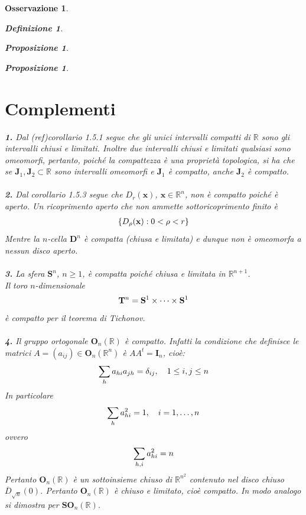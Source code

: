 \documentclass[oneside, 11pt]{amsbook}
\newcommand{\0}{{(0)}}
\newcommand{\3}{{(3)}}
\theoremstyle{colonplain}
\newtheorem{prop}[thm]{Proposizione}
\theoremstyle{colondefinition}
\newtheorem{defn}[thm]{Definizione}
\theoremstyle{colonremark}
\newtheorem{rmk}[thm]{Osservazione}
\numberwithin{equation}{chapter}
\begin{document}
\begin{rmk}
\begin{defn}
\begin{prop}
\begin{prop}
\section{Complementi}
\textbf{1.} Dal (ref)\textit{corollario 1.5.1} segue che gli unici intervalli compatti di $\mathbb{R}$ sono gli intervalli chiusi e limitati. Inoltre due intervalli chiusi e limitati qualsiasi sono omeomorfi, pertanto, poiché la compattezza è una proprietà topologica, si ha che se $\mathbf{J}_1, \mathbf{J}_2 \subset \mathbb{R}$ sono intervalli omeomorfi e $\mathbf{J}_1$ è compatto, anche $\mathbf{J}_2$ è compatto. \\ \\
\textbf{2.} Dal \textit{corollario 1.5.3} segue che $D_r(\mathbf{x})$, $\mathbf{x} \in \mathbb{R}^n$, non è compatto poiché è aperto. Un ricoprimento aperto che non ammette sottoricoprimento finito è
\begin{align}
    \{ D_\rho (\mathbf{x}) : 0 < \rho < r \} \notag
\end{align}
Mentre la $n$-cella $\mathbf{D}^n$ è compatta (chiusa e limitata) e dunque non è omeomorfa a nessun disco aperto. \\ \\
\textbf{3.} La sfera $\mathbf{S}^n$, $n \geq 1$, è compatta poiché chiusa e limitata in $\mathbb{R}^{n + 1}$. \\
Il \textit{toro} $n$-dimensionale
\begin{align}
    \mathbf{T}^n = \mathbf{S}^1 \times \dots \times \mathbf{S}^1 \notag
\end{align}
è compatto per il \textit{teorema di Tichonov}. \\ \\
\textbf{4.} Il gruppo ortogonale $\mathbf{O}_n(\mathbb{R})$ è compatto. Infatti la condizione che definisce le matrici $A = (a_{ij}) \in \mathbf{O}_n(\mathbb{R}^n)$ è $AA^t = \mathbf{I}_n$, cioè:
\begin{align}
    \sum_h a_{hi}a_{jh} = \delta_{ij}, \quad 1 \leq i, j \leq n \notag
\end{align}
In particolare
\begin{align}
    \sum_h a^2_{hi} = 1, \quad i = 1, \dots, n \notag
\end{align}
ovvero
\begin{align}
    \sum_{h, i} a^2_{hi} = n \notag
\end{align}
Pertanto $\mathbf{O}_n(\mathbb{R})$ è un sottoinsieme chiuso di $\mathbb{R}^{n^2}$ contenuto nel disco chiuso $\overline{D}_{\sqrt{n}}(0)$. Pertanto $\mathbf{O}_n(\mathbb{R})$ è chiuso e limitato, cioè compatto. In modo analogo si dimostra per $\mathbf{SO}_n(\mathbb{R})$. \\ \\

\end{prop}
\end{prop}
\end{defn}
\end{rmk}
\end{document}
